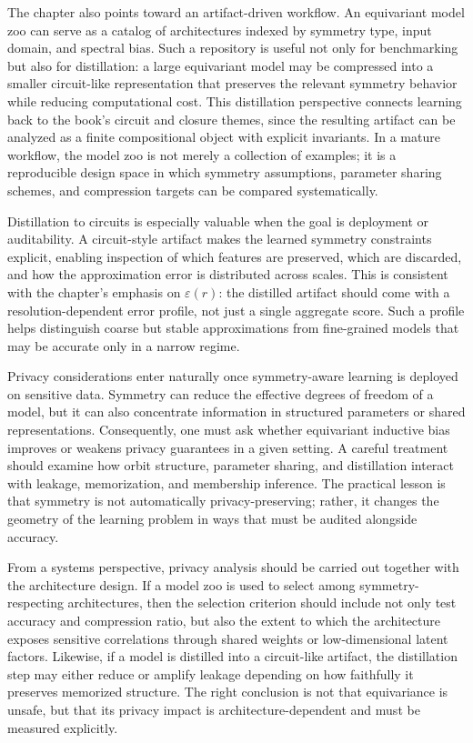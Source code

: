 \documentclass[11pt]{article}
\begin{document}
The chapter also points toward an artifact-driven workflow. An equivariant model zoo can serve as a catalog of architectures indexed by symmetry type, input domain, and spectral bias. Such a repository is useful not only for benchmarking but also for distillation: a large equivariant model may be compressed into a smaller circuit-like representation that preserves the relevant symmetry behavior while reducing computational cost. This distillation perspective connects learning back to the book's circuit and closure themes, since the resulting artifact can be analyzed as a finite compositional object with explicit invariants. In a mature workflow, the model zoo is not merely a collection of examples; it is a reproducible design space in which symmetry assumptions, parameter sharing schemes, and compression targets can be compared systematically.

Distillation to circuits is especially valuable when the goal is deployment or auditability. A circuit-style artifact makes the learned symmetry constraints explicit, enabling inspection of which features are preserved, which are discarded, and how the approximation error is distributed across scales. This is consistent with the chapter's emphasis on \(\varepsilon(r)\): the distilled artifact should come with a resolution-dependent error profile, not just a single aggregate score. Such a profile helps distinguish coarse but stable approximations from fine-grained models that may be accurate only in a narrow regime.

Privacy considerations enter naturally once symmetry-aware learning is deployed on sensitive data. Symmetry can reduce the effective degrees of freedom of a model, but it can also concentrate information in structured parameters or shared representations. Consequently, one must ask whether equivariant inductive bias improves or weakens privacy guarantees in a given setting. A careful treatment should examine how orbit structure, parameter sharing, and distillation interact with leakage, memorization, and membership inference. The practical lesson is that symmetry is not automatically privacy-preserving; rather, it changes the geometry of the learning problem in ways that must be audited alongside accuracy.

From a systems perspective, privacy analysis should be carried out together with the architecture design. If a model zoo is used to select among symmetry-respecting architectures, then the selection criterion should include not only test accuracy and compression ratio, but also the extent to which the architecture exposes sensitive correlations through shared weights or low-dimensional latent factors. Likewise, if a model is distilled into a circuit-like artifact, the distillation step may either reduce or amplify leakage depending on how faithfully it preserves memorized structure. The right conclusion is not that equivariance is unsafe, but that its privacy impact is architecture-dependent and must be measured explicitly.
\end{document}
